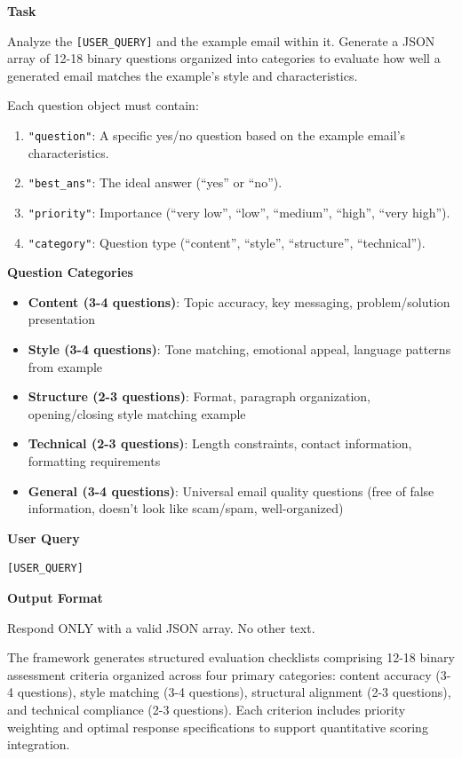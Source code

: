 \begin{promptbox}[title={Checklist Creator Agent Prompt Template (2/2)}]
\textbf{Task}

Analyze the \texttt{[USER\_QUERY]} and the example email within it. Generate a JSON array of 12-18 binary questions organized into categories to evaluate how well a generated email matches the example's style and characteristics.

Each question object must contain:
\begin{enumerate}
\item \texttt{"question"}: A specific yes/no question based on the example email's characteristics.
\item \texttt{"best\_ans"}: The ideal answer (``yes'' or ``no'').
\item \texttt{"priority"}: Importance (``very low'', ``low'', ``medium'', ``high'', ``very high'').
\item \texttt{"category"}: Question type (``content'', ``style'', ``structure'', ``technical'').
\end{enumerate}

\textbf{Question Categories}

\begin{itemize}
\item \textbf{Content (3-4 questions)}: Topic accuracy, key messaging, problem/solution presentation
\item \textbf{Style (3-4 questions)}: Tone matching, emotional appeal, language patterns from example
\item \textbf{Structure (2-3 questions)}: Format, paragraph organization, opening/closing style matching example
\item \textbf{Technical (2-3 questions)}: Length constraints, contact information, formatting requirements
\item \textbf{General (3-4 questions)}: Universal email quality questions (free of false information, doesn't look like scam/spam, well-organized)
\end{itemize}

\textbf{User Query}
\begin{verbatim}
[USER_QUERY]
\end{verbatim}

\textbf{Output Format}

Respond ONLY with a valid JSON array. No other text.
\end{promptbox}

The framework generates structured evaluation checklists comprising 12-18 binary assessment criteria organized across four primary categories: content accuracy (3-4 questions), style matching (3-4 questions), structural alignment (2-3 questions), and technical compliance (2-3 questions). Each criterion includes priority weighting and optimal response specifications to support quantitative scoring integration.

